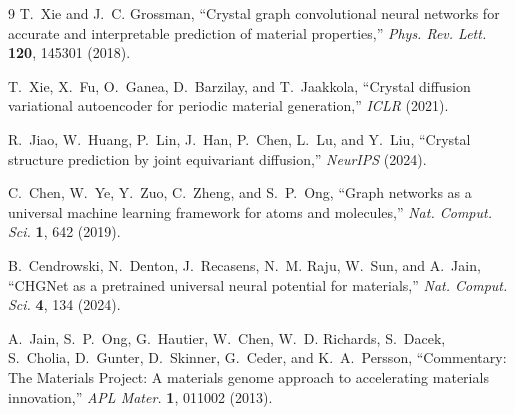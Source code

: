 \documentclass[11pt,a4paper]{article}
\begin{document}
\begin{thebibliography}{9}
T.~Xie and J.~C. Grossman,
``Crystal graph convolutional neural networks for accurate and
interpretable prediction of material properties,''
\textit{Phys. Rev. Lett.} \textbf{120}, 145301 (2018).

T.~Xie, X.~Fu, O.~Ganea, D.~Barzilay, and T.~Jaakkola,
``Crystal diffusion variational autoencoder for periodic material
generation,''
\textit{ICLR} (2021).

R.~Jiao, W.~Huang, P.~Lin, J.~Han, P.~Chen, L.~Lu, and Y.~Liu,
``Crystal structure prediction by joint equivariant diffusion,''
\textit{NeurIPS} (2024).

C.~Chen, W.~Ye, Y.~Zuo, C.~Zheng, and S.~P.~Ong,
``Graph networks as a universal machine learning framework for
atoms and molecules,''
\textit{Nat. Comput. Sci.} \textbf{1}, 642 (2019).

B.~Cendrowski, N.~Denton, J.~Recasens, N.~M. Raju, W.~Sun, and
A.~Jain,
``CHGNet as a pretrained universal neural potential for
materials,''
\textit{Nat. Comput. Sci.} \textbf{4}, 134 (2024).

A.~Jain, S.~P.~Ong, G.~Hautier, W.~Chen, W.~D. Richards,
S.~Dacek, S.~Cholia, D.~Gunter, D.~Skinner, G.~Ceder, and
K.~A.~Persson,
``Commentary: The Materials Project: A materials genome approach to
accelerating materials innovation,''
\textit{APL Mater.} \textbf{1}, 011002 (2013).
\end{thebibliography}
\end{document}
